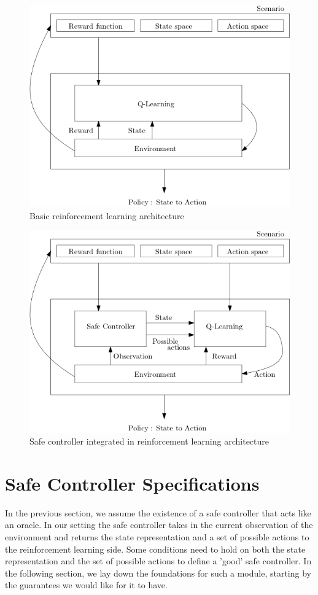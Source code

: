 \documentclass[a4paper,11pt]{article}
\begin{document}
\medskip 

\begin{figure}[H]
  \centering
  \includegraphics[scale=0.55]{basicrl.png}
  \caption{Basic reinforcement learning architecture}
  \label{fig:basicrl}
\end{figure}


\begin{figure}[H]
  \centering
  \includegraphics[scale=0.55]{rlsc.png}
  \caption{Safe controller integrated in reinforcement learning architecture}
  \label{fig:scinrl}
\end{figure}

\section{Safe Controller Specifications} \label{scspecs}
In the previous section, we assume the existence of a safe controller that acts like an oracle.
In our setting the safe controller takes in the current observation of the environment and 
returns the state representation and a set of possible actions to the reinforcement learning side. 
Some conditions need to hold on both the state representation and the set of possible actions to define a 'good' safe controller.
In the following section, we lay down the foundations 
for such a module, starting by the guarantees we would like for it to have. 
\end{document}
